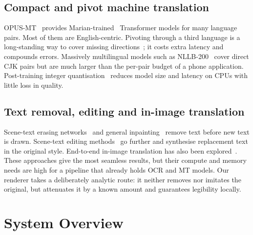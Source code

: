 \documentclass[journal]{IEEEtran}
\theoremstyle{definition}
\begin{document}
\subsection{Compact and pivot machine translation}
OPUS-MT~\cite{tiedemann2020opusmt} provides Marian-trained~\cite{junczys2018marian}
Transformer models for many language pairs. Most of them are English-centric.
Pivoting through a third language is a long-standing way to cover missing
directions~\cite{utiyama2007pivot}; it costs extra latency and compounds
errors. Massively multilingual models such as NLLB-200~\cite{nllb2022} cover
direct CJK pairs but are much larger than the per-pair budget of a phone
application. Post-training integer quantisation~\cite{jacob2018quant} reduces
model size and latency on CPUs with little loss in quality.

\subsection{Text removal, editing and in-image translation}
Scene-text erasing networks~\cite{zhang2019ensnet} and general
inpainting~\cite{telea2004inpaint,suvorov2022lama} remove text before new text
is drawn. Scene-text editing methods~\cite{wu2019srnet,roy2020stefann} go
further and synthesise replacement text in the original style. End-to-end
in-image translation has also been explored~\cite{mansimov2020inimage}. These
approaches give the most seamless results, but their compute and memory needs
are high for a pipeline that already holds OCR and MT models. Our renderer
takes a deliberately analytic route: it neither removes nor imitates the
original, but attenuates it by a known amount and guarantees legibility
locally.

\section{System Overview}\label{sec:overview}
\end{document}
